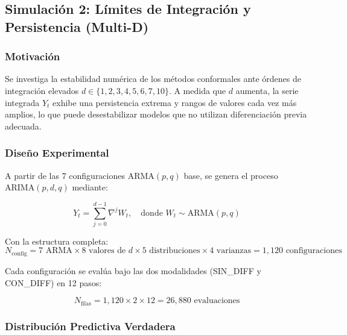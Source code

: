 

\subsection{Simulación 2: Límites de Integración y Persistencia (Multi-D)}
\label{subsec:sim2_multi_d}

\subsubsection{Motivación}

Se investiga la estabilidad numérica de los métodos conformales ante órdenes de integración elevados $d \in \{1, 2, 3, 4, 5, 6, 7, 10\}$. A medida que $d$ aumenta, la serie integrada $Y_t$ exhibe una persistencia extrema y rangos de valores cada vez más amplios, lo que puede desestabilizar modelos que no utilizan diferenciación previa adecuada.

\subsubsection{Diseño Experimental}

A partir de las 7 configuraciones ARMA$(p,q)$ base, se genera el proceso ARIMA$(p,d,q)$ mediante:

\begin{equation}
Y_t = \sum_{j=0}^{d-1} \nabla^j W_t, \quad \text{donde } W_t \sim \text{ARMA}(p,q)
\end{equation}

Con la estructura completa:
\begin{equation}
N_{\text{config}} = 7 \text{ ARMA} \times 8 \text{ valores de } d \times 5 \text{ distribuciones} \times 4 \text{ varianzas} = 1{,}120 \text{ configuraciones}
\end{equation}

Cada configuración se evalúa bajo las dos modalidades (SIN\_DIFF y CON\_DIFF) en 12 pasos:

\begin{equation}
N_{\text{filas}} = 1{,}120 \times 2 \times 12 = 26{,}880 \text{ evaluaciones}
\end{equation}

\subsubsection{Distribución Predictiva Verdadera}

